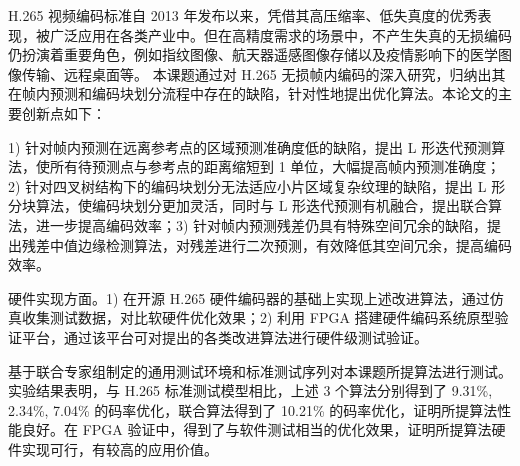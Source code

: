 \begin{cabstract}
    H.265 视频编码标准自 2013 年发布以来，凭借其高压缩率、低失真度的优秀表现，被广泛应用在各类产业中。但在高精度需求的场景中，不产生失真的无损编码仍扮演着重要角色，例如指纹图像、航天器遥感图像存储以及疫情影响下的医学图像传输、远程桌面等。    
    本课题通过对 H.265 无损帧内编码的深入研究，归纳出其在帧内预测和编码块划分流程中存在的缺陷，针对性地提出优化算法。本论文的主要创新点如下：

    1) 针对帧内预测在远离参考点的区域预测准确度低的缺陷，提出 L 形迭代预测算法，使所有待预测点与参考点的距离缩短到 1 单位，大幅提高帧内预测准确度；2) 针对四叉树结构下的编码块划分无法适应小片区域复杂纹理的缺陷，提出 L 形分块算法，使编码块划分更加灵活，同时与 L 形迭代预测有机融合，提出联合算法，进一步提高编码效率；3) 针对帧内预测残差仍具有特殊空间冗余的缺陷，提出残差中值边缘检测算法，对残差进行二次预测，有效降低其空间冗余，提高编码效率。

    硬件实现方面。1) 在开源 H.265 硬件编码器的基础上实现上述改进算法，通过仿真收集测试数据，对比软硬件优化效果；2) 利用 FPGA 搭建硬件编码系统原型验证平台，通过该平台可对提出的各类改进算法进行硬件级测试验证。

    基于联合专家组制定的通用测试环境和标准测试序列对本课题所提算法进行测试。实验结果表明，与 H.265 标准测试模型相比，上述 3 个算法分别得到了 9.31\%, 2.34\%, 7.04\% 的码率优化，联合算法得到了 10.21\% 的码率优化，证明所提算法性能良好。在 FPGA 验证中，得到了与软件测试相当的优化效果，证明所提算法硬件实现可行，有较高的应用价值。
\end{cabstract}


